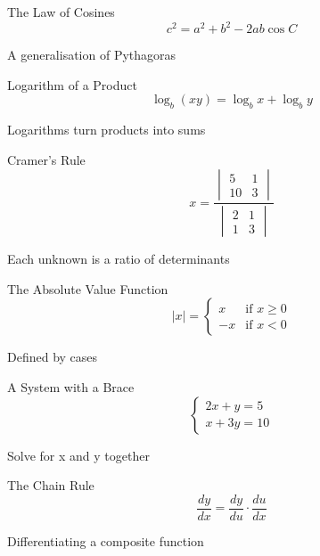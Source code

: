 \documentclass[aspectratio=169]{beamer}
\begin{document}
\begin{frame}{The Law of Cosines}
\centering
\label{eq023}{\Huge \[ c^2 = a^2 + b^2 - 2ab\cos C \]}
\vspace{0.6em}

{\small A generalisation of Pythagoras}
\end{frame}
\begin{frame}{Logarithm of a Product}
\centering
\label{eq024}{\Huge \[ \log_b(xy) = \log_b x + \log_b y \]}
\vspace{0.6em}

{\small Logarithms turn products into sums}
\end{frame}
\begin{frame}{Cramer's Rule}
\centering
\label{eq025}{\huge \[ x = \frac{\begin{vmatrix} 5 & 1 \\ 10 & 3 \end{vmatrix}}{\begin{vmatrix} 2 & 1 \\ 1 & 3 \end{vmatrix}} \]}
\vspace{0.6em}

{\small Each unknown is a ratio of determinants}
\end{frame}
\begin{frame}{The Absolute Value Function}
\centering
\label{eq026}{\huge \[ |x| = \begin{cases} x & \text{if } x \ge 0 \\ -x & \text{if } x < 0 \end{cases} \]}
\vspace{0.6em}

{\small Defined by cases}
\end{frame}
\begin{frame}{A System with a Brace}
\centering
\label{eq027}{\huge \[ \left\{ \begin{array}{l} 2x + y = 5 \\ x + 3y = 10 \end{array} \right. \]}
\vspace{0.6em}

{\small Solve for x and y together}
\end{frame}
\begin{frame}{The Chain Rule}
\centering
\label{eq028}{\Huge \[ \frac{dy}{dx} = \frac{dy}{du} \cdot \frac{du}{dx} \]}
\vspace{0.6em}

{\small Differentiating a composite function}
\end{frame}
\end{document}

